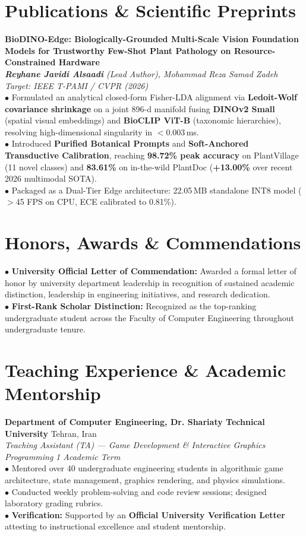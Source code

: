 \documentclass[10pt,a4paper]{article}
\begin{document}
\section{Publications \& Scientific Preprints}
\textbf{BioDINO-Edge: Biologically-Grounded Multi-Scale Vision Foundation Models for Trustworthy Few-Shot Plant Pathology on Resource-Constrained Hardware}\\
\textit{\textbf{Reyhane Javidi Alsaadi} (Lead Author), Mohammad Reza Samad Zadeh} \hfill \textit{Target: IEEE T-PAMI / CVPR (2026)}\\
$\bullet$ Formulated an analytical closed-form Fisher-LDA alignment via \textbf{Ledoit-Wolf covariance shrinkage} on a joint 896-d manifold fusing \textbf{DINOv2 Small} (spatial visual embeddings) and \textbf{BioCLIP ViT-B} (taxonomic hierarchies), resolving high-dimensional singularity in $<0.003$\,ms.\\
$\bullet$ Introduced \textbf{Purified Botanical Prompts} and \textbf{Soft-Anchored Transductive Calibration}, reaching \textbf{98.72\% peak accuracy} on PlantVillage (11 novel classes) and \textbf{83.61\%} on in-the-wild PlantDoc (\textbf{+13.00\%} over recent 2026 multimodal SOTA).\\
$\bullet$ Packaged as a Dual-Tier Edge architecture: 22.05\,MB standalone INT8 model ($>$45 FPS on CPU, ECE calibrated to 0.81\%).

\section{Honors, Awards \& Commendations}
$\bullet$ \textbf{University Official Letter of Commendation:} Awarded a formal letter of honor by university department leadership in recognition of sustained academic distinction, leadership in engineering initiatives, and research dedication.\\
$\bullet$ \textbf{First-Rank Scholar Distinction:} Recognized as the top-ranking undergraduate student across the Faculty of Computer Engineering throughout undergraduate tenure.

\section{Teaching Experience \& Academic Mentorship}
\textbf{Department of Computer Engineering, Dr. Shariaty Technical University} \hfill Tehran, Iran\\
\textit{Teaching Assistant (TA) --- Game Development \& Interactive Graphics Programming} \hfill \textit{1 Academic Term}\\
$\bullet$ Mentored over 40 undergraduate engineering students in algorithmic game architecture, state management, graphics rendering, and physics simulations.\\
$\bullet$ Conducted weekly problem-solving and code review sessions; designed laboratory grading rubrics.\\
$\bullet$ \textbf{Verification:} Supported by an \textbf{Official University Verification Letter} attesting to instructional excellence and student mentorship.
\end{document}
